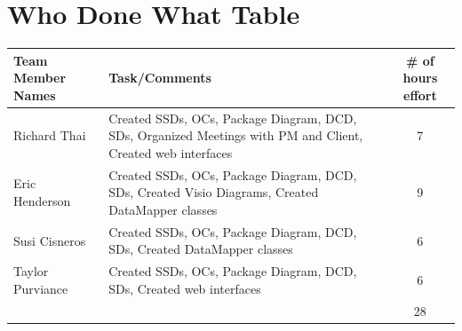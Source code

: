 \documentclass{article}
\begin{document}
\section{Who Done What Table}
\begin{tabular}{ | l | p{3in} | c | }
\hline
Team Member Names & Task/Comments & \# of hours effort\\
\hline
\hline
Richard Thai & Created SSDs, OCs, Package Diagram, DCD, SDs, Organized Meetings with PM and Client, Created web interfaces & 7\\
\hline
Eric Henderson & Created SSDs, OCs, Package Diagram, DCD, SDs, Created Visio Diagrams, Created DataMapper classes & 9\\
\hline
Susi Cisneros & Created SSDs, OCs, Package Diagram, DCD, SDs, Created DataMapper classes & 6\\
\hline
Taylor Purviance & Created SSDs, OCs, Package Diagram, DCD, SDs, Created web interfaces & 6\\
\hline
 &  & 28\\
\hline
\end{tabular}
\end{document}
